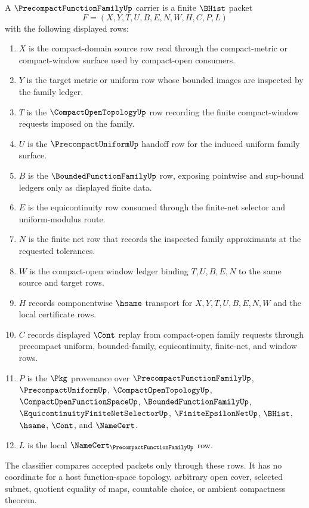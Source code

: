 \begin{definition}
\label{def:precompact-function-family-carrier}
A $\PrecompactFunctionFamilyUp$ carrier is a finite $\BHist$ packet
$$
F=(X,Y,T,U,B,E,N,W,H,C,P,L)
$$
with the following displayed rows:
\begin{enumerate}
\item $X$ is the compact-domain source row read through the compact-metric or compact-window surface used by compact-open consumers.
\item $Y$ is the target metric or uniform row whose bounded images are inspected by the family ledger.
\item $T$ is the $\CompactOpenTopologyUp$ row recording the finite compact-window requests imposed on the family.
\item $U$ is the $\PrecompactUniformUp$ handoff row for the induced uniform family surface.
\item $B$ is the $\BoundedFunctionFamilyUp$ row, exposing pointwise and sup-bound ledgers only as displayed finite data.
\item $E$ is the equicontinuity row consumed through the finite-net selector and uniform-modulus route.
\item $N$ is the finite net row that records the inspected family approximants at the requested tolerances.
\item $W$ is the compact-open window ledger binding $T,U,B,E,N$ to the same source and target rows.
\item $H$ records componentwise $\hsame$ transport for $X,Y,T,U,B,E,N,W$ and the local certificate rows.
\item $C$ records displayed $\Cont$ replay from compact-open family requests through precompact uniform, bounded-family, equicontinuity, finite-net, and window rows.
\item $P$ is the $\Pkg$ provenance over $\PrecompactFunctionFamilyUp$, $\PrecompactUniformUp$, $\CompactOpenTopologyUp$, $\CompactOpenFunctionSpaceUp$, $\BoundedFunctionFamilyUp$, $\EquicontinuityFiniteNetSelectorUp$, $\FiniteEpsilonNetUp$, $\BHist$, $\hsame$, $\Cont$, and $\NameCert$.
\item $L$ is the local $\NameCert_{\PrecompactFunctionFamilyUp}$ row.
\end{enumerate}
The classifier compares accepted packets only through these rows. It has no coordinate for a host function-space topology, arbitrary open cover, selected subnet, quotient equality of maps, countable choice, or ambient compactness theorem.
\end{definition}

